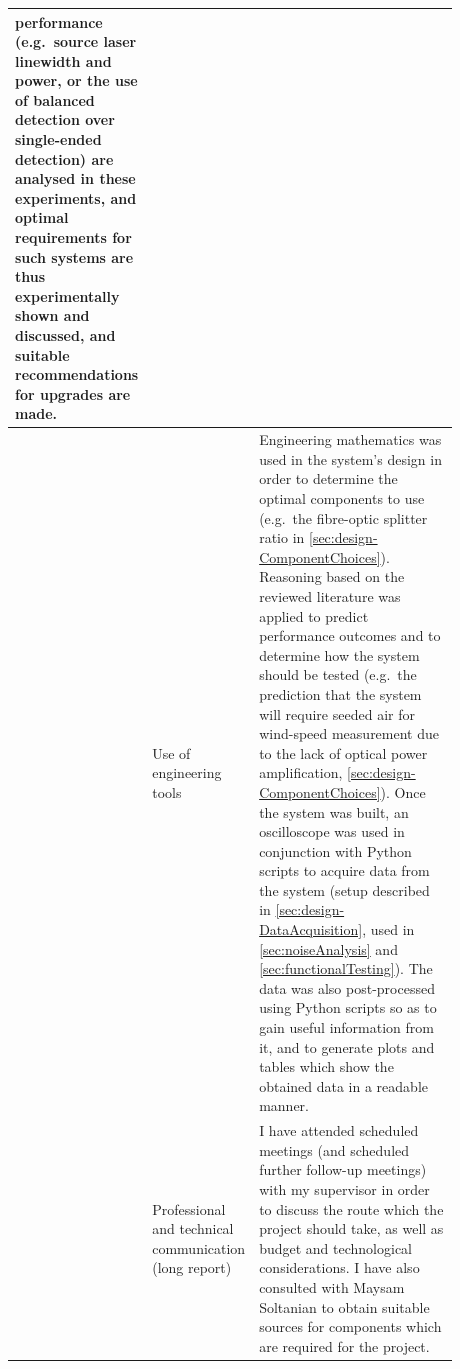 \begin{longtable}{|>{\centering\arraybackslash}p{0.05\linewidth}
		|>{\raggedright\arraybackslash}p{0.17\linewidth}
		|p{0.66\linewidth}||}
	performance (e.g.\ source laser linewidth and power, or the use of balanced detection over single-ended detection) are analysed in these experiments, and optimal requirements for such systems
	are thus experimentally shown and discussed, and suitable recommendations for upgrades are made. \\
	\hline
	5 & Use of engineering tools & Engineering mathematics was used in the system's design in order to determine the optimal components to use (e.g.\ the fibre-optic splitter ratio in \autoref{sec:design-ComponentChoices}). Reasoning based on the reviewed literature was applied to predict performance outcomes and to determine how the system should be tested (e.g.\ the prediction that the system will require seeded air for wind-speed measurement due to the lack of optical power amplification, \autoref{sec:design-ComponentChoices}). Once the system was built, an oscilloscope was used in conjunction with Python scripts to acquire data from the system (setup described in \autoref{sec:design-DataAcquisition}, used in \autoref{sec:noiseAnalysis} and \autoref{sec:functionalTesting}). The data was also post-processed using Python scripts so as to gain useful information from it, and to generate plots and tables which show the obtained data in a readable manner. \\
	\hline
	6 & Professional and technical communication (long report) & I have attended scheduled meetings (and scheduled further follow-up meetings) with my supervisor in
	order to discuss the route which the project should take, as well as budget and technological
	considerations. I have also consulted with Maysam Soltanian to obtain suitable sources for components
	which are required for the project.
	

\end{longtable}
